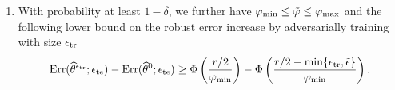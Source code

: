 \begin{theorem}
\begin{enumerate}
  \item
    With probability at least $1-\delta$, we further have $\varphi_{\text{min}} \leq \tilde{\varphi}\leq \varphi_{\text{max}}$ and  the following lower bound on the robust error increase by adversarially training with size $\epsilon_{\text{tr}}$
    \begin{equation}
      \text{Err}(\widehat{\theta}^{\epsilon_{\text{tr}}};\epsilon_{\text{te}}) - \text{Err}(\widehat{\theta}^{0};\epsilon_{\text{te}})
      \geq 
      \Phi \left(\frac{r/2}{\varphi_{\text{min}}} \right) - \Phi \left(  \frac{r/2 -\min\{\epsilon_{\text{tr}}, \tilde{\epsilon}\}}{ \varphi_{\text{min}}} \right).
    \end{equation}
    


\end{enumerate}
\end{theorem}
